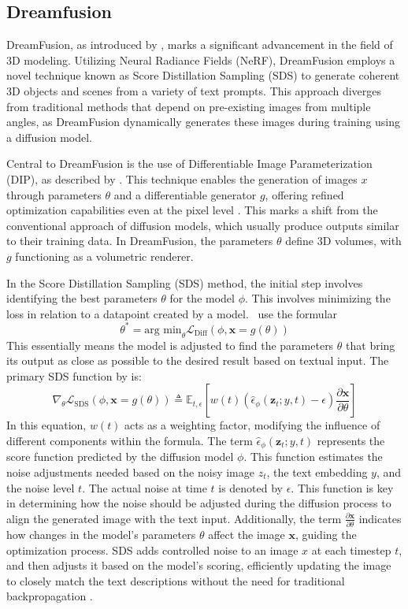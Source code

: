 \subsection{Dreamfusion}\label{dreamfusion}

DreamFusion, as introduced by \citeauthor{pooleDreamfusion}, marks a significant advancement in the field of 3D modeling. Utilizing Neural Radiance Fields (NeRF), DreamFusion employs a novel technique known as Score Distillation Sampling (SDS) to generate coherent 3D objects and scenes from a variety of text prompts. This approach diverges from traditional methods that depend on pre-existing images from multiple angles, as DreamFusion dynamically generates these images during training using a diffusion model.

Central to DreamFusion is the use of Differentiable Image Parameterization (DIP), as described by \citep{mordvintsevDIP}. This technique enables the generation of images \( x \) through parameters \( \theta \) and a differentiable generator \( g \), offering refined optimization capabilities even at the pixel level \citep{pooleDreamfusion}. This marks a shift from the conventional approach of diffusion models, which usually produce outputs similar to their training data. In DreamFusion, the parameters \( \theta \) define 3D volumes, with \( g \) functioning as a volumetric renderer. 

In the Score Distillation Sampling (SDS) method, the initial step involves identifying the best parameters \( \theta \) for the model \(\phi\). This involves minimizing the loss in relation to a datapoint created by a model.~\citeauthor{pooleDreamfusion} use the formular~\[ \theta^{*} = \text{arg min}_{\theta} \mathcal{L}_{\text{Diff}}(\phi, \mathbf{x} = g(\theta)) \] This essentially means the model is adjusted to find the parameters \( \theta \) that bring its output as close as possible to the desired result based on textual input. The primary SDS function by \citeauthor{pooleDreamfusion} is:~\[
\nabla_{\theta}\mathcal{L}_{\text{SDS}}(\phi,\mathbf{x}=g(\theta))\triangleq\mathbb{E}_{t,\epsilon}\left[w(t)\left(\hat{\epsilon}_{\phi}({\mathbf{z}}_{t};y,t)-\epsilon\right){\frac{\partial\mathbf{x}}{\partial\theta}}\right]
\] In this equation, \( w(t) \) acts as a weighting factor, modifying the influence of different components within the formula. The term \( \hat{\epsilon}_{\phi}({\mathbf{z}}_{t};y,t) \) represents the score function predicted by the diffusion model \( \phi \). This function estimates the noise adjustments needed based on the noisy image \( z_t \), the text embedding \( y \), and the noise level \( t \). The actual noise at time \( t \) is denoted by \( \epsilon \). This function is key in determining how the noise should be adjusted during the diffusion process to align the generated image with the text input. Additionally, the term \( \frac{\partial\mathbf{x}}{\partial\theta} \) indicates how changes in the model’s parameters \( \theta \) affect the image \( \mathbf{x} \), guiding the optimization process. SDS adds controlled noise to an image \( x \) at each timestep \( t \), and then adjusts it based on the model's scoring, efficiently updating the image to closely match the text descriptions without the need for traditional backpropagation \citep{pooleDreamfusion}.

